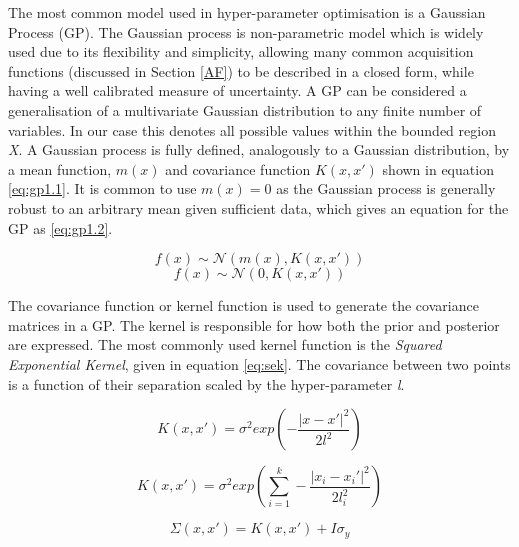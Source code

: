 \documentclass{article}
\begin{document}
			The most common model used in hyper-parameter optimisation is a Gaussian Process (GP)\cite{17}. The Gaussian process is non-parametric model which is widely used due to its flexibility and simplicity, allowing many common acquisition functions (discussed in Section \ref{AF}) to be described in a closed form, while having a well calibrated measure of uncertainty. A GP can be considered a generalisation of a multivariate Gaussian distribution to any finite number of variables. In our case this denotes all possible values within the bounded region \textit{X}. A Gaussian process is fully defined, analogously to a Gaussian distribution, by a mean function, \(m(x)\) and covariance function \(K(x,x')\) shown in equation \ref{eq:gp1.1}. It is common to use \(m(x) = 0\) as the Gaussian process is generally robust to an arbitrary mean given sufficient data, which gives an equation for the GP as \ref{eq:gp1.2}.

			\begin{equation}\label{eq:gp1.1}f(x) \sim  \mathcal{N}(m(x) , K(x,x'))\end{equation}
			\begin{equation}\label{eq:gp1.2}f(x) \sim  \mathcal{N}(0 , K(x,x'))\end{equation}

			The covariance function or kernel function is used to generate the covariance matrices in a GP. The kernel is responsible for how both the prior and posterior are expressed. The most commonly used kernel function is the \textit{Squared Exponential Kernel}, given in equation \ref{eq:sek}. The covariance between two points is a function of their separation scaled by the hyper-parameter \textit{l}. 

			\begin{equation} \label{eq:sek} K(x,x') = \sigma^2 exp\left(-\frac{\mathopen|x - x'\mathclose|^2}{2l^2}\right)\end{equation}

			\begin{equation} \label{eq:ncov} K(x,x') = \sigma^2 exp\left(\sum_{i=1}^k-\frac{\mathopen|x_i - x_i'\mathclose|^2}{2l_i^2}\right)\end{equation}

			\begin{equation}\label{eq:sigy} \Sigma(x,x') = K(x,x') + I \sigma_y \end{equation}
\end{document}
